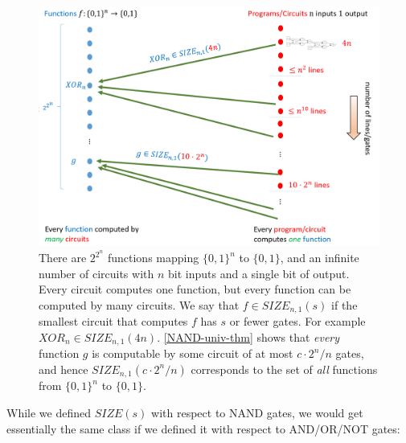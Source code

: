 \begin{figure}
\centering
\includegraphics[width=\textwidth, height=0.25\paperheight, keepaspectratio]{../figure/funcvscircs.png}
\caption{There are \(2^{2^n}\) functions mapping \(\{0,1\}^n\) to
\(\{0,1\}\), and an infinite number of circuits with \(n\) bit inputs
and a single bit of output. Every circuit computes one function, but
every function can be computed by many circuits. We say that
\(f \in \ensuremath{\mathit{SIZE}}_{n,1}(s)\) if the smallest circuit
that computes \(f\) has \(s\) or fewer gates. For example
\(\ensuremath{\mathit{XOR}}_n \in \ensuremath{\mathit{SIZE}}_{n,1}(4n)\).
\cref{NAND-univ-thm} shows that \emph{every} function \(g\) is
computable by some circuit of at most \(c\cdot 2^n/n\) gates, and hence
\(\ensuremath{\mathit{SIZE}}_{n,1}(c\cdot 2^n/n)\) corresponds to the
set of \emph{all} functions from \(\{0,1\}^n\) to \(\{0,1\}\).}
\label{funcvscircfig}
\end{figure}

While we defined \(\ensuremath{\mathit{SIZE}}(s)\) with respect to NAND
gates, we would get essentially the same class if we defined it with
respect to AND/OR/NOT gates:

\hypertarget{nandaonsizelem}{}

